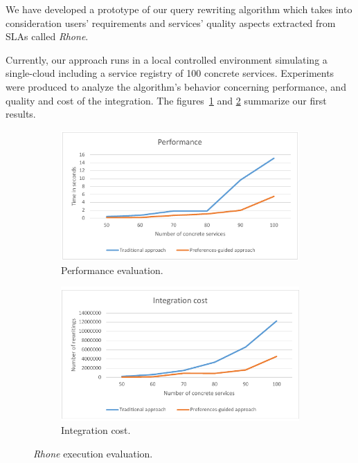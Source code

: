 We have developed a prototype of our query rewriting algorithm which takes into consideration users' requirements and services' quality aspects extracted from SLAs called \textsl{Rhone}.

Currently, our approach runs in a local controlled environment simulating a single-cloud including a service registry of 100 concrete services. Experiments were produced to analyze the algorithm's behavior concerning performance, and quality and cost of the integration. The figures~\ref{fig01} and \ref{fig02} summarize our first results.

\begin{figure}
\centering
\begin{subfigure}{.5\textwidth}
  \centering
  \includegraphics[scale=0.61]{fig1.pdf}
  \caption{Performance evaluation.}
  \label{fig01}
\end{subfigure}%
\begin{subfigure}{.5\textwidth}
  \centering
  \includegraphics[scale=0.53]{fig2.pdf}
  \caption{Integration cost.}\label{fig02}
\end{subfigure}
\caption{\textit{Rhone} execution evaluation.}
\label{fig:figs-exp}
\end{figure}


